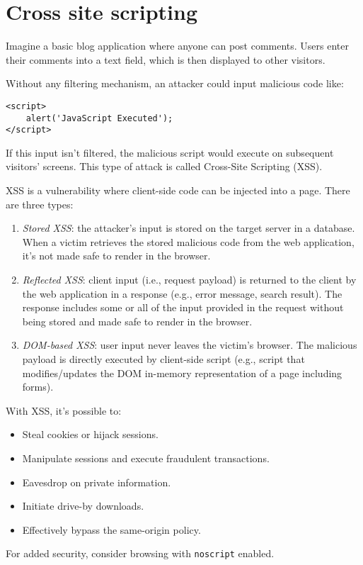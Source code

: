 \section{Cross site scripting}
Imagine a basic blog application where anyone can post comments. 
Users enter their comments into a text field, which is then displayed to other visitors.

Without any filtering mechanism, an attacker could input malicious code like:
\begin{verbatim}
<script>
    alert('JavaScript Executed');
</script>
\end{verbatim}
If this input isn't filtered, the malicious script would execute on subsequent visitors' screens. 
This type of attack is called Cross-Site Scripting (XSS).

XSS is a vulnerability where client-side code can be injected into a page.
There are three types:
\begin{enumerate}
    \item \textit{Stored XSS}: the attacker's input is stored on the target server in a database. 
        When a victim retrieves the stored malicious code from the web application, it's not made safe to render in the browser.
    \item \textit{Reflected XSS}: client input (i.e., request payload) is returned to the client by the web application in a response (e.g., error message, search result). 
        The response includes some or all of the input provided in the request without being stored and made safe to render in the browser.
    \item \textit{DOM-based XSS}: user input never leaves the victim's browser. 
        The malicious payload is directly executed by client-side script (e.g., script that modifies/updates the DOM in-memory representation of a page including forms).
\end{enumerate}
With XSS, it's possible to:
\begin{itemize}
    \item Steal cookies or hijack sessions.
    \item Manipulate sessions and execute fraudulent transactions.
    \item Eavesdrop on private information.
    \item Initiate drive-by downloads.
    \item Effectively bypass the same-origin policy.
\end{itemize}
For added security, consider browsing with \texttt{noscript} enabled.

